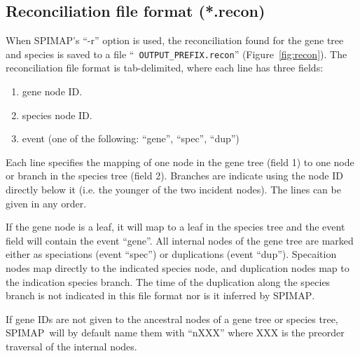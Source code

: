 \documentclass[11pt]{article}
\newcommand{\figref}[1]{Figure~\ref{#1}}
\newcommand{\spimap}{{\sf\scshape SPIMAP}}
\begin{document}
\subsection{Reconciliation file format (*.recon)}
\label{sec:file:recon}

When \spimap's ``-r'' option is used, the reconciliation found for the
gene tree and species is saved to a file ``{\tt
OUTPUT\_PREFIX.recon}'' (\figref{fig:recon}).  The reconciliation file
format is tab-delimited, where each line has three fields:
\begin{enumerate}[itemsep=0pt,topsep=0pt]
\item gene node ID.  
\item species node ID.
\item event (one of the following: ``gene'', ``spec'', ``dup'')
\end{enumerate}

Each line specifies the mapping of one node in the gene tree (field 1) to one 
node or branch in the species tree (field 2).  Branches are indicate using
the node ID directly below it (i.e. the younger of the two incident nodes).
The lines can be given in any order.

If the gene node is a leaf, it will map to a leaf in the species tree and
the event field will contain the event ``gene''.  All internal nodes of
the gene tree are marked either as speciations (event ``spec'') or
duplications (event ``dup'').  Specaition nodes map directly to the indicated
species node, and duplication nodes map to the indication species branch.
The time of the duplication along the species branch is not indicated
in this file format nor is it inferred by \spimap.

If gene IDs are not given to the ancestral nodes of a gene tree or species
tree, \spimap\ will by default name them with ``nXXX'' where XXX is the
preorder traversal of the internal nodes.
\end{document}
